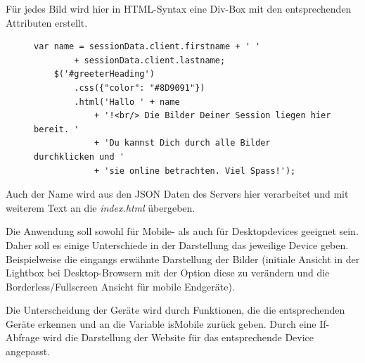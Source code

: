 Für jedes Bild wird hier in HTML-Syntax eine Div-Box mit den entsprechenden Attributen erstellt. 

\begin{figure}[h]
	\begin{lstlisting}[caption={Auszug aus app.js (Webclient)}, label=list_client]
	var name = sessionData.client.firstname + ' ' 
		+ sessionData.client.lastname;
	$('#greeterHeading')
		.css({"color": "#8D9091"})
		.html('Hallo ' + name 
			+ '!<br/> Die Bilder Deiner Session liegen hier bereit. ' 
			+ 'Du kannst Dich durch alle Bilder durchklicken und '
			+ 'sie online betrachten. Viel Spass!');
	\end{lstlisting}
\end{figure}


Auch der Name wird aus den JSON Daten des Servers hier verarbeitet und mit weiterem Text an die \textit{index.html} übergeben. 

Die Anwendung soll sowohl für Mobile- als auch für Desktopdevices geeignet sein. Daher soll es einige Unterschiede in der Darstellung das jeweilige Device geben. Beispielweise die eingangs erwähnte Darstellung der Bilder (initiale Ansicht in der Lightbox bei Desktop-Browsern mit der Option diese zu verändern und die Borderless/Fullscreen Ansicht für mobile Endgeräte). 

Die Unterscheidung der Geräte wird durch Funktionen, die die entsprechenden Geräte erkennen und an die Variable isMobile zurück geben. Durch eine If-Abfrage wird die Darstellung der Website für das entsprechende Device angepasst.

